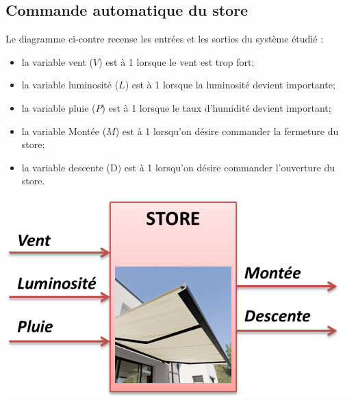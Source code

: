 \documentclass[10pt]{article}
\newif\ifprof
\begin{document}
\subsection{Commande automatique du store}

\ifprof

\else
\begin{minipage}[c]{.48\linewidth}
Le diagramme ci-contre recense les entrées et les sorties du système étudié :
\begin{itemize}
\item la variable vent ($V$) est à 1 lorsque le vent est trop fort;
\item la variable luminosité ($L$) est à 1 lorsque la luminosité devient importante;
\item la variable pluie ($P$) est à 1 lorsque le taux d’humidité devient important;
\item la variable Montée ($M$) est à 1 lorsqu’on désire commander la fermeture du store;
\item la variable descente (D$)$ est à 1 lorsqu’on désire commander l’ouverture du store. 
\end{itemize}
\end{minipage} \hfill
\begin{minipage}[c]{.48\linewidth}
\begin{center}
\includegraphics[width=.95\textwidth]{images/ES}
\end{center}
\end{minipage} 

\fi
\end{document}
